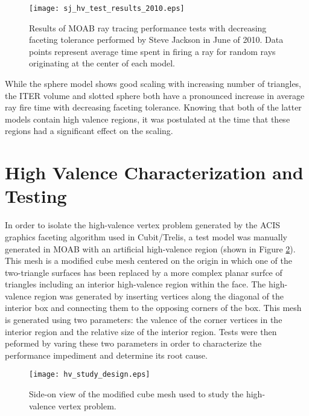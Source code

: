 \begin{figure}[H]
  \begin{center}
    \texttt{[image: sj\_hv\_test\_results\_2010.eps]} \\
    \caption{Results of MOAB ray tracing performance tests with decreasing
      faceting tolerance performed by Steve Jackson in June of 2010. Data points
      represent average time spent in firing a ray for random rays
      originating at the center of each model.}
    \label{fig:sj_hv_test_results}
  \end{center}
\end{figure}

While the sphere model shows good scaling with increasing number of triangles,
the ITER volume and slotted sphere both have a pronounced increase in average
ray fire time with decreasing faceting tolerance. Knowing that both of the
latter models contain high valence regions, it was postulated at the time that
these regions had a significant effect on the scaling. 

\section{High Valence Characterization and Testing}

In order to isolate the
high-valence vertex problem generated by the ACIS graphics faceting algorithm
used in Cubit/Trelis, a test model was manually generated in MOAB with an
artificial high-valence region (shown in Figure \ref{fig:hv_cube_design}). This mesh
is a modified cube mesh centered on the origin in which one of the two-triangle
surfaces has been replaced by a more complex planar surfce of triangles
including an interior high-valence region within the face. The high-valence
region was generated by inserting vertices along the diagonal of the interior
box and connecting them to the opposing corners of the box. This mesh is
generated using two parameters: the valence of the corner vertices in the
interior region and the relative size of the interior region. Tests were then
peformed by varing these two parameters in order to characterize the performance
impediment and determine its root cause.

\begin{figure}[H]
  \centering
    \texttt{[image: hv\_study\_design.eps]}
    \caption{Side-on view of the modified cube mesh used to study the
      high-valence vertex problem.}
    \label{fig:hv_cube_design}
\end{figure}

